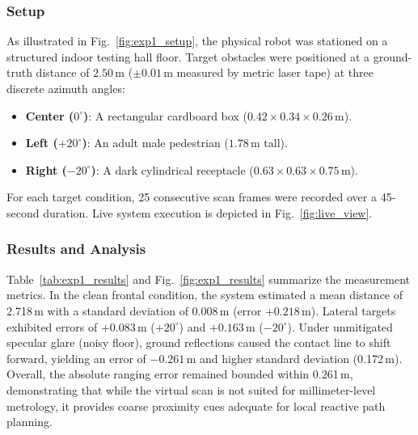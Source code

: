 \documentclass{ieeeaccess}
\begin{document}
\subsubsection{Setup}
As illustrated in Fig.~\ref{fig:exp1_setup}, the physical robot was stationed on a structured indoor testing hall floor. Target obstacles were positioned at a ground-truth distance of $2.50$\,m ($\pm0.01$\,m measured by metric laser tape) at three discrete azimuth angles:
\begin{itemize}
  \item \textbf{Center ($0^\circ$)}: A rectangular cardboard box ($0.42 \times 0.34 \times 0.26$\,m).
  \item \textbf{Left ($+20^\circ$)}: An adult male pedestrian ($1.78$\,m tall).
  \item \textbf{Right ($-20^\circ$)}: A dark cylindrical receptacle ($0.63 \times 0.63 \times 0.75$\,m).
\end{itemize}
For each target condition, 25 consecutive scan frames were recorded over a 45-second duration. Live system execution is depicted in Fig.~\ref{fig:live_view}.

\subsubsection{Results and Analysis}
Table~\ref{tab:exp1_results} and Fig.~\ref{fig:exp1_results} summarize the measurement metrics. In the clean frontal condition, the system estimated a mean distance of 2.718\,m with a standard deviation of 0.008\,m (error $+0.218$\,m). Lateral targets exhibited errors of $+0.083$\,m ($+20^\circ$) and $+0.163$\,m ($-20^\circ$). Under unmitigated specular glare (noisy floor), ground reflections caused the contact line to shift forward, yielding an error of $-0.261$\,m and higher standard deviation (0.172\,m). Overall, the absolute ranging error remained bounded within 0.261\,m, demonstrating that while the virtual scan is not suited for millimeter-level metrology, it provides coarse proximity cues adequate for local reactive path planning.
\end{document}
